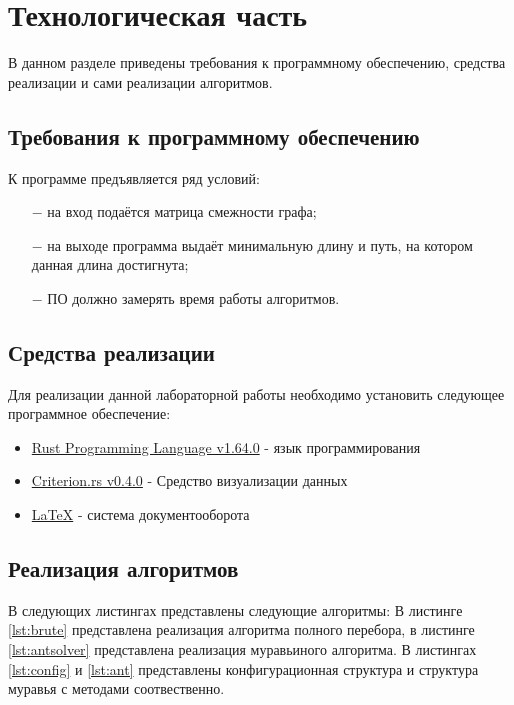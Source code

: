 \chapter{Технологическая часть}

В данном разделе приведены требования к программному обеспечению, средства реализации и сами реализации алгоритмов.

\section{Требования к программному обеспечению}
К программе предъявляется ряд условий:
\begin{itemize}
    \item[$-$] на вход подаётся матрица смежности графа;
    \item[$-$] на выходе программа выдаёт минимальную длину и путь, на котором данная длина достигнута;
    \item[$-$] ПО должно замерять время работы алгоритмов.
\end{itemize}

\section{Средства реализации}
Для реализации данной лабораторной работы необходимо установить следующее программное обеспечение:
\begin{itemize}
    \item \href{https://www.rust-lang.org/}{Rust Programming Language v1.64.0} - язык программирования
    \item \href{https://github.com/bheisler/criterion.rs}{Criterion.rs v0.4.0} - Средство визуализации данных
    \item \href{https://www.latex-project.org/}{LaTeX} - система документооборота
\end{itemize}

\section{Реализация алгоритмов}
В следующих листингах представлены следующие алгоритмы:
В листинге \ref{lst:brute} представлена реализация алгоритма полного перебора, в листинге \ref{lst:antsolver} представлена реализация муравьиного алгоритма. В листингах \ref{lst:config} и \ref{lst:ant} представлены конфигурационная структура и структура муравья с методами соотвественно.


